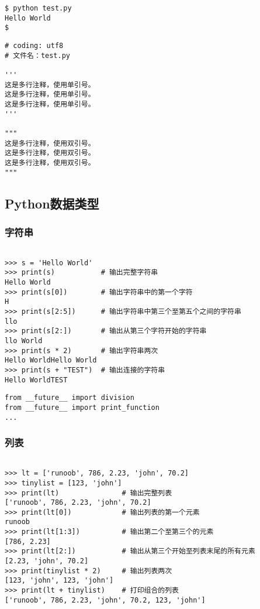 \begin{verbatim}
$ python test.py
Hello World
$ 
\end{verbatim}


\begin{verbatim}
# coding: utf8
# 文件名：test.py

'''
这是多行注释，使用单引号。
这是多行注释，使用单引号。
这是多行注释，使用单引号。
'''

"""
这是多行注释，使用双引号。
这是多行注释，使用双引号。
这是多行注释，使用双引号。
"""
\end{verbatim}

\subsection{Python数据类型}
\subsubsection{字符串}
\begin{verbatim}

>>> s = 'Hello World'
>>> print(s)           # 输出完整字符串
Hello World
>>> print(s[0])        # 输出字符串中的第一个字符
H
>>> print(s[2:5])      # 输出字符串中第三个至第五个之间的字符串
llo
>>> print(s[2:])       # 输出从第三个字符开始的字符串
llo World
>>> print(s * 2)       # 输出字符串两次
Hello WorldHello World
>>> print(s + "TEST")  # 输出连接的字符串
Hello WorldTEST
\end{verbatim}

\begin{verbatim}
from __future__ import division
from __future__ import print_function
...
\end{verbatim}



\subsubsection{列表}
\begin{verbatim}

>>> lt = ['runoob', 786, 2.23, 'john', 70.2]
>>> tinylist = [123, 'john']
>>> print(lt)               # 输出完整列表
['runoob', 786, 2.23, 'john', 70.2]
>>> print(lt[0])            # 输出列表的第一个元素
runoob
>>> print(lt[1:3])          # 输出第二个至第三个的元素 
[786, 2.23]
>>> print(lt[2:])           # 输出从第三个开始至列表末尾的所有元素
[2.23, 'john', 70.2]
>>> print(tinylist * 2)     # 输出列表两次
[123, 'john', 123, 'john']
>>> print(lt + tinylist)    # 打印组合的列表
['runoob', 786, 2.23, 'john', 70.2, 123, 'john']
\end{verbatim}

